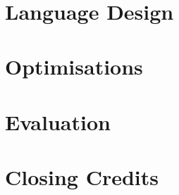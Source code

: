 \documentclass[10pt,a4paper,final,oneside,openany]{memoir}
\begin{document}
\frontmatter

 \clearpage

\maketitle
~
\vspace{3cm}
  \begin{abstract}

  \end{abstract}

\setlength{\cftpartnumwidth}{4em}

\clearpage
\tableofcontents*

\mainmatter
{}


\part{Language Design}
\label{part:languagedesign}







\part{Optimisations}









\part{Evaluation}





\clearpage

\part{Closing Credits}

{}
\printbibliography

\backmatter
\appendix

\end{document}
